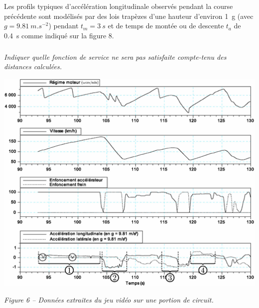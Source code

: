 \documentclass[10pt,fleqn]{article} %
\begin{document}
Les profils typiques d'accélération longitudinale observés pendant la course précédente sont modélisés par des lois trapèzes d'une hauteur d'environ \SI{1}{g} (avec $g = \SI{9,81}{m.s^{-2}}$) pendant $t_m = \SI{3}{s}$ et de temps de montée ou de descente $t_a$ de \SI{0,4}{s} comme indiqué sur la figure 8.%


\subparagraph{}
\textit{Indiquer quelle fonction de service ne sera pas satisfaite compte-tenu des distances calculées. }
\ifprof
\begin{corrige}
\end{corrige}
\else
\fi


\begin{center}
\includegraphics[width=.9\linewidth]{images/fig_06}

\textit{Figure 6 -- Données extraites du jeu vidéo sur une portion de circuit.}
\end{center}
\end{document}

